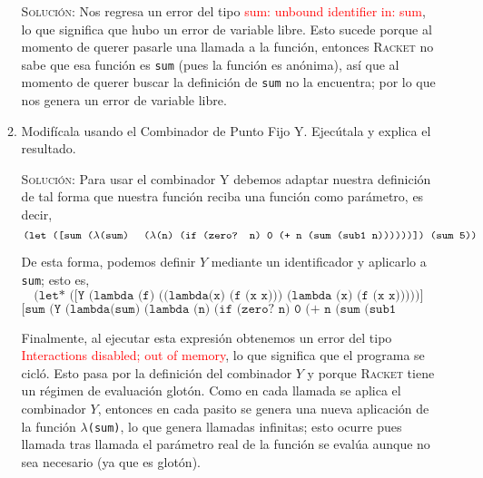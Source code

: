 \documentclass[letterpaper,11pt]{article}
\begin{document}
\begin{enumerate}
\begin{enumerate}
        \textsc{Solución:} Nos regresa un error del tipo 
        \textcolor{red}{sum: unbound identifier in: sum}, lo que significa 
        que hubo un error de variable libre. Esto sucede porque al momento 
        de querer pasarle una llamada a la función, entonces \textsc{Racket}
        no sabe que esa función es \texttt{sum} (pues la función es anónima), 
        así que al momento de querer buscar la definición de \texttt{sum} no 
        la encuentra; por lo que nos genera un error de variable libre.

        \item Modifícala usando el Combinador de Punto Fijo Y. Ejecútala y 
        explica el resultado.

        \textsc{Solución:} Para usar el combinador Y debemos adaptar nuestra
        definición de tal forma que nuestra función reciba una función como 
        parámetro, es decir, 
        \begin{equation*}
            \texttt{(let ([sum (} \lambda \texttt{(sum) \; (} \lambda 
            \texttt{(n) (if (zero? n) 0 (+ n (sum (sub1 n)))))}
            \texttt{)]) (sum 5))}
        \end{equation*}

        De esta forma, podemos definir $Y$ mediante un identificador y 
        aplicarlo a \texttt{sum}; esto es,
        \begin{equation*}
            \texttt{(let* ([Y (lambda (f) ((lambda(x) (f (x x))) 
            (lambda (x) (f (x x)))))]}
        \end{equation*}
        \begin{equation*}
            \texttt{[sum (Y (lambda(sum) (lambda (n) (if (zero? n) 0 
            (+ n (sum (sub1 n)))))))]) (sum 5))}
        \end{equation*}

        Finalmente, al ejecutar esta expresión obtenemos un error del tipo 
        \textcolor{red}{Interactions disabled; out of memory}, lo que 
        significa que el programa se cicló. Esto pasa por la definición del 
        combinador $Y$ y porque \textsc{Racket} tiene un régimen de 
        evaluación glotón. Como en cada llamada se aplica el combinador $Y$, 
        entonces en cada pasito se genera una nueva aplicación de la función 
        $\lambda$\texttt{(sum)}, lo que genera llamadas infinitas; esto 
        ocurre pues llamada tras llamada el parámetro real de la función se 
        evalúa aunque no sea necesario (ya que es glotón).
    \end{enumerate}
\end{enumerate}
\end{document}
